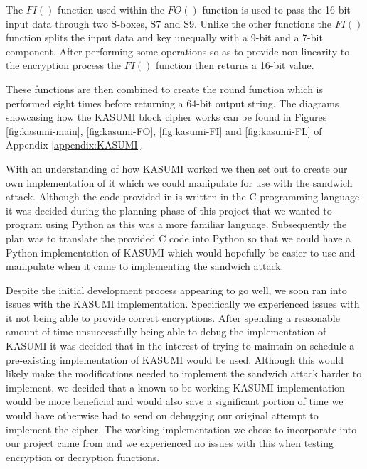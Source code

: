 \documentclass[10pt,journal,compsoc]{IEEEtran}
\begin{document}
The \(FI()\) function used within the \(FO()\) function is used to pass the 16-bit input data through two S-boxes, S7 and S9. Unlike the other functions the \(FI()\) function splits the input data and key unequally with a 9-bit and a 7-bit component. After performing some operations so as to provide non-linearity to the encryption process the \(FI()\) function then returns a 16-bit value.

These functions are then combined to create the round function which is performed eight times before returning a 64-bit output string. The diagrams showcasing how the KASUMI block cipher works can be found in Figures \ref{fig:kasumi-main}, \ref{fig:kasumi-FO}, \ref{fig:kasumi-FI} and \ref{fig:kasumi-FL} of Appendix \ref{appendix:KASUMI}.

With an understanding of how KASUMI worked we then set out to create our own implementation of it which we could manipulate for use with the sandwich attack. Although the code provided in \cite{kasumispec} is written in the C programming language it was decided during the planning phase of this project that we wanted to program using Python as this was a more familiar language. Subsequently the plan was to translate the provided C code into Python so that we could have a Python implementation of KASUMI which would hopefully be easier to use and manipulate when it came to implementing the sandwich attack. 

Despite the initial development process appearing to go well, we soon ran into issues with the KASUMI implementation. Specifically we experienced issues with it not being able to provide correct encryptions. After spending a reasonable amount of time unsuccessfully being able to debug the implementation of KASUMI it was decided that in the interest of trying to maintain on schedule a pre-existing implementation of KASUMI would be used. Although this would likely make the modifications needed to implement the sandwich attack harder to implement, we decided that a known to be working KASUMI implementation would be more beneficial and would also save a significant portion of time we would have otherwise had to send on debugging our original attempt to implement the cipher. The working implementation we chose to incorporate into our project came from \cite{asecuritysite_82320} and we experienced no issues with this when testing encryption or decryption functions.
 
\end{document}
